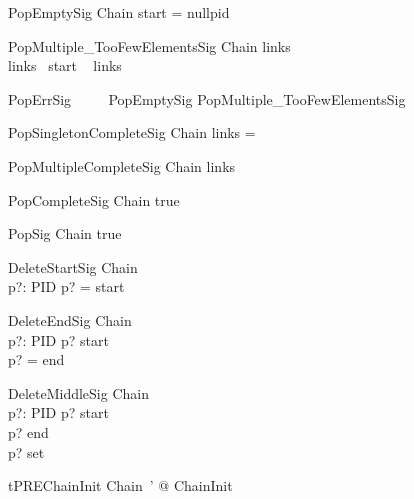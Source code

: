 \begin{schema}{PopEmptySig}
  Chain
\where
  start = nullpid
\end{schema}

\begin{schema}{PopMultiple\_TooFewElementsSig}
  Chain
\where
  links \neq  \emptyset\\
  links~ start \notin  \dom~  links
\end{schema}

\begin{zed}
   PopErrSig ~~~~  PopEmptySig \lor PopMultiple\_TooFewElementsSig
\end{zed}

\begin{schema}{PopSingletonCompleteSig}
  Chain
\where
  links = \emptyset
\end{schema}

\begin{schema}{PopMultipleCompleteSig}
  Chain
\where
  links \neq  \emptyset
\end{schema}

\begin{schema}{PopCompleteSig}
  Chain
\where
  true
\end{schema}

\begin{schema}{PopSig}
  Chain
  \where
  true
\end{schema}

\begin{schema}{DeleteStartSig}
  Chain\\
  p?: PID
\where
  p? = start
\end{schema}

\begin{schema}{DeleteEndSig}
  Chain\\
  p?: PID
\where
  p? \neq  start\\
  p? = end
\end{schema}

\begin{schema}{DeleteMiddleSig}
  Chain \\
  p?: PID
\where
  p? \neq start\\
  p? \neq end\\
  p? \in  set\\
\end{schema}

\begin{theorem}{tPREChainInit}
\exists  Chain~' @ ChainInit
\end{theorem}

